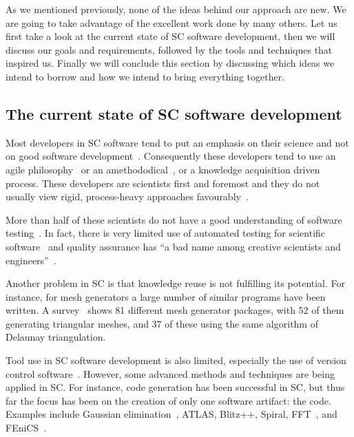 \documentclass[preprint, 10pt]{sigplanconf}
\begin{document}
As we mentioned previously, none of the ideas behind our approach are new. We
are going to take advantage of the excellent work done by many others.  Let us
first take a look at the current state of SC software development, then we will
discuss our goals and requirements, followed by the tools and techniques that
inspired us. Finally we will conclude this section by discussing which ideas we
intend to borrow and how we intend to bring everything together.

\subsection{The current state of SC software development}
\label{subsec:scdev}

Most developers in SC software tend to put an emphasis on their science and not on good
software development~\cite{Kelly2007}. 
Consequently these developers tend to use an agile
philosophy~\cite{AckroydEtAl2008, CarverEtAl2007, EasterbrookAndJohns2009,
Segal2005} or an amethododical~\cite{Kelly2013}, or a knowledge acquisition
driven~\cite{Kelly2015} process. These developers are scientists first and
foremost and they do not usually view rigid, process-heavy approaches
favourably~\cite{CarverEtAl2007}.

More than half of these scientists do not have a good understanding of software
testing~\cite{Merali2010}. In fact, there is very limited use of automated
testing for scientific software~\cite{PatrickEtAl2015} and quality
assurance has ``a bad name among creative scientists and
engineers''~\cite[p.~352]{Roache1998}.

Another problem in SC is that knowledge reuse is not fulfilling its potential.
For instance, for mesh generators a large number of similar programs have been
written. A survey~\cite{Owen1998} shows 81 different mesh generator packages,
with 52 of them generating triangular meshes, and 37 of these using the same
algorithm of Delaunay triangulation. %

Tool use in SC software development is also limited, especially the use of
version control software~\cite{Wilson2006}.  However, some advanced methods and
techniques are being applied in SC.  For instance, code generation has been
successful in SC, but thus far the focus has been on the creation of only one
software artifact: the code. Examples include Gaussian
elimination~\cite{Carette2006}, ATLAS, Blitz++, Spiral,
FFT~\cite{KiselyovEtAl2004}, and FEniCS~\cite{LoggEtAl2012}.
\end{document}
